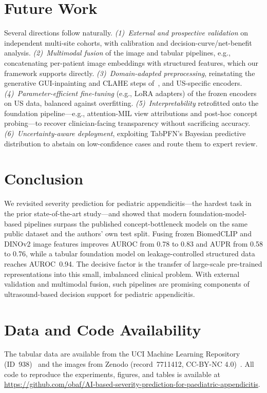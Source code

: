 \documentclass[journal]{IEEEtran}
\begin{document}
\section{Future Work}
Several directions follow naturally. \emph{(1)~External and prospective validation} on
independent multi-site cohorts, with calibration and decision-curve/net-benefit
analysis. \emph{(2)~Multimodal fusion} of the image and tabular pipelines, e.g.,
concatenating per-patient image embeddings with structured features, which our framework
supports directly. \emph{(3)~Domain-adapted preprocessing}, reinstating the generative
GUI-inpainting and CLAHE steps of~\cite{marcinkevics2024interpretable}, and US-specific
encoders. \emph{(4)~Parameter-efficient fine-tuning} (e.g., LoRA adapters) of the frozen
encoders on US data, balanced against overfitting. \emph{(5)~Interpretability}
retrofitted onto the foundation pipeline---e.g., attention-MIL view attributions and
post-hoc concept probing---to recover clinician-facing transparency without sacrificing
accuracy. \emph{(6)~Uncertainty-aware deployment}, exploiting TabPFN's Bayesian
predictive distribution to abstain on low-confidence cases and route them to expert
review.

\section{Conclusion}
We revisited severity prediction for pediatric appendicitis---the hardest task in the
prior state-of-the-art study---and showed that modern foundation-model-based pipelines
surpass the published concept-bottleneck models on the same public dataset and the
authors' own test split. Fusing frozen BiomedCLIP and DINOv2 image features improves
AUROC from 0.78 to 0.83 and AUPR from 0.58 to 0.76, while a tabular foundation model on
leakage-controlled structured data reaches AUROC~0.94. The decisive factor is the
transfer of large-scale pre-trained representations into this small, imbalanced clinical
problem. With external validation and multimodal fusion, such pipelines are promising
components of ultrasound-based decision support for pediatric appendicitis.

\section*{Data and Code Availability}
The tabular data are available from the UCI Machine Learning Repository
(ID~938)~\cite{uci938} and the images from Zenodo (record~7711412, CC-BY-NC
4.0)~\cite{zenodo7711412}. All code to reproduce the experiments, figures, and tables is
available at
\url{https://github.com/obaf/AI-based-severity-prediction-for-paediatric-appendicitis}.
\end{document}

